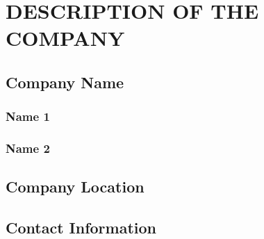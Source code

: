 \chapter{DESCRIPTION OF THE COMPANY}

\section{Company Name}

\subsection{Name 1}

\subsection{Name 2}

\section{Company Location}

\section{Contact Information}
